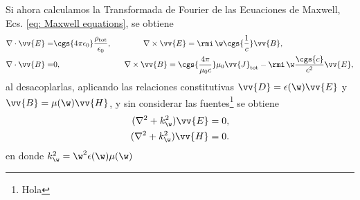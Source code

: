 Si ahora calculamos la Transformada de Fourier de las Ecuaciones de Maxwell, Ecs. \ref{eq: Maxwell equations}, se obtiene
\begin{align}
\nabla\cdot\vv{E} =& \cgs{4\pi\epsilon_0}\frac{\rho_{\text{tot}}}{\epsilon_0}, \qquad \qquad \nabla\times\vv{E}= \rmi \,\w\cgs{\frac{1}{c}}\vv{B}, \nonumber \\
\nabla\cdot\vv{B} =& 0, \qquad \qquad \qquad \qquad \nabla\times\vv{B}=\cgs{\frac{4\pi}{\mu_0 c}}\mu_0\vv{J}_{\text{tot}}- \rmi \, \w\frac{\cgs{c}}{c^2}\vv{E},
\label{eq: Maxwell equations freq}
\end{align}
al desacoplarlas, aplicando las relaciones constitutivas $\vv{D}=\epsilon(\w)\vv{E}$ y $\vv{B} = \mu(\w) \vv{H}$, y sin considerar las fuentes\footnote{Hola} se obtiene
\begin{align*}
(\nabla^2 + k_{\w}^2)\vv{E} = 0, \\
(\nabla^2 + k_{\w}^2)\vv{H} = 0.
\end{align*}
en donde $k_{\w}^2=\w^2 \epsilon(\w) \mu(\w)$